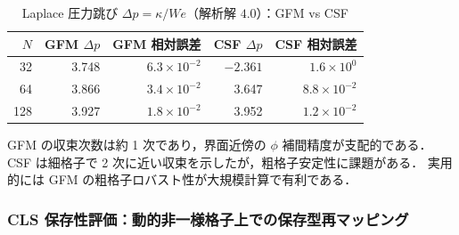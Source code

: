 \begin{table}[htbp]
\centering
\caption{Laplace 圧力跳び $\Delta p = \kappa/\mathit{We}$（解析解 $4.0$）：GFM vs CSF}
\label{tab:gfm_laplace}
\begin{tabular}{rrrrr}
\toprule
$N$ & GFM $\Delta p$ & GFM 相対誤差 & CSF $\Delta p$ & CSF 相対誤差 \\
\midrule
 32 & 3.748 & $6.3 \times 10^{-2}$ & $-2.361$ & $1.6 \times 10^{0}$ \\
 64 & 3.866 & $3.4 \times 10^{-2}$ &  3.647  & $8.8 \times 10^{-2}$ \\
128 & 3.927 & $1.8 \times 10^{-2}$ &  3.952  & $1.2 \times 10^{-2}$ \\
\bottomrule
\end{tabular}
\end{table}

GFM の収束次数は約 1 次であり，界面近傍の $\phi$ 補間精度が支配的である．
CSF は細格子で 2 次に近い収束を示したが，粗格子安定性に課題がある．
実用的には GFM の粗格子ロバスト性が大規模計算で有利である．

\subsubsection{CLS 保存性評価：動的非一様格子上での保存型再マッピング}
\label{sec:cls_conservation}%
\label{app:cls_conservation}%

